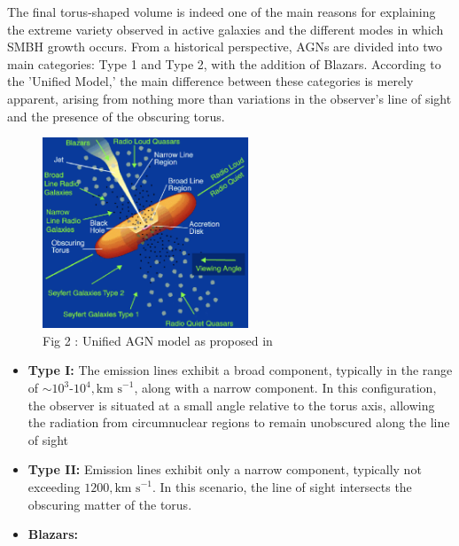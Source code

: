 The final torus-shaped volume is indeed one of the main reasons for explaining the extreme variety observed in active galaxies and the different modes in which SMBH growth occurs. From a historical perspective, AGNs are divided into two main categories: Type 1 and Type 2, with the addition of Blazars. According to the 'Unified Model,' the main difference between these categories is merely apparent, arising from nothing more than variations in the observer's line of sight and the presence of the obscuring torus.

\begin{figure}[b]
  \centering
  \includegraphics[width=0.55\textwidth]{UnifiedAGNmodel}
  \caption{Fig 2 : Unified AGN model as proposed in \cite{1995PASP..107..803U}}
  \label{2}
\end{figure}


\begin{itemize}
  \item \textbf{Type I:} The emission lines exhibit a broad component, typically in the range of $\sim 10^{3}$-$10^{4}, \text{km s}^{-1}$, along with a narrow component. In this configuration, the observer is situated at a small angle relative to the torus axis, allowing the radiation from circumnuclear regions to remain unobscured along the line of sight
  
  \item \textbf{Type II:} Emission lines exhibit only a narrow component, typically not exceeding $1200 , \text{km s}^{-1}$. In this scenario, the line of sight intersects the obscuring matter of the torus.
  
  \item \textbf{Blazars:} 
\end{itemize}



